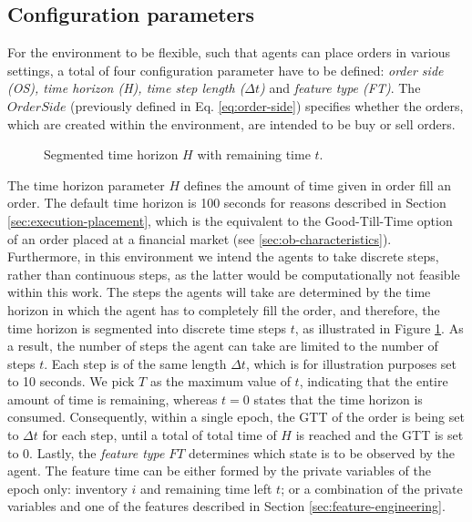 \subsection{Configuration parameters}
\label{setup:parameters}
For the environment to be flexible, such that agents can place orders in various settings, a total of four configuration parameter have to be defined: \textit{order side (OS), time horizon (H), time step length ($\Delta{t}$)} and \textit{feature type (FT)}.
The $OrderSide$ (previously defined in Eq. \ref{eq:order-side}) specifies whether the orders, which are created within the environment, are intended to be buy or sell orders.
\begin{figure}[H]
    \centering
    \caption{Segmented time horizon $H$ with remaining time $t$.}
    \label{fig:setup-time-horizon}
\end{figure}
The time horizon parameter $H$ defines the amount of time given in order fill an order.
The default time horizon is 100 seconds for reasons described in Section \ref{sec:execution-placement}, which is the equivalent to the Good-Till-Time option of an order placed at a financial market (see \ref{sec:ob-characteristics}).
Furthermore, in this environment we intend the agents to take discrete steps, rather than continuous steps, as the latter would be computationally not feasible within this work.
The steps the agents will take are determined by the time horizon in which the agent has to completely fill the order, and therefore, the time horizon is segmented into discrete time steps $t$, as illustrated in Figure \ref{fig:setup-time-horizon}. 
As a result, the number of steps the agent can take are limited to the number of steps $t$.
Each step is of the same length $\Delta{t}$, which is for illustration purposes set to 10 seconds.
We pick $T$ as the maximum value of $t$, indicating that the entire amount of time is remaining, whereas $t=0$ states that the time horizon is consumed.
Consequently, within a single epoch, the GTT of the order is being set to $\Delta{t}$ for each step, until a total of total time of $H$ is reached and the GTT is set to 0.
Lastly, the \textit{feature type} $FT$ determines which state is to be observed by the agent.
The feature time can be either formed by the private variables of the epoch only: inventory $i$ and remaining time left $t$; or a combination of the private variables and one of the features described in Section \ref{sec:feature-engineering}.

